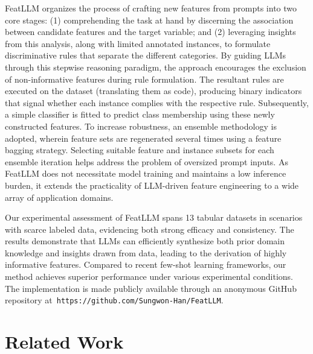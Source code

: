\textsf{FeatLLM} organizes the process of crafting new features from prompts into two core stages: (1) comprehending the task at hand by discerning the association between candidate features and the target variable; and (2) leveraging insights from this analysis, along with limited annotated instances, to formulate discriminative rules that separate the different categories. By guiding LLMs through this stepwise reasoning paradigm, the approach encourages the exclusion of non-informative features during rule formulation. The resultant rules are executed on the dataset (translating them as code), producing binary indicators that signal whether each instance complies with the respective rule. Subsequently, a simple classifier is fitted to predict class membership using these newly constructed features. To increase robustness, an ensemble methodology is adopted, wherein feature sets are regenerated several times using a feature bagging strategy. Selecting suitable feature and instance subsets for each ensemble iteration helps address the problem of oversized prompt inputs. As \textsf{FeatLLM} does not necessitate model training and maintains a low inference burden, it extends the practicality of LLM-driven feature engineering to a wide array of application domains.

Our experimental assessment of \textsf{FeatLLM} spans 13 tabular datasets in scenarios with scarce labeled data, evidencing both strong efficacy and consistency. The results demonstrate that LLMs can efficiently synthesize both prior domain knowledge and insights drawn from data, leading to the derivation of highly informative features. Compared to recent few-shot learning frameworks, our method achieves superior performance under various experimental conditions. The implementation is made publicly available through an anonymous GitHub repository at~\texttt{https://github.com/Sungwon-Han/FeatLLM}.

\section{Related Work}

